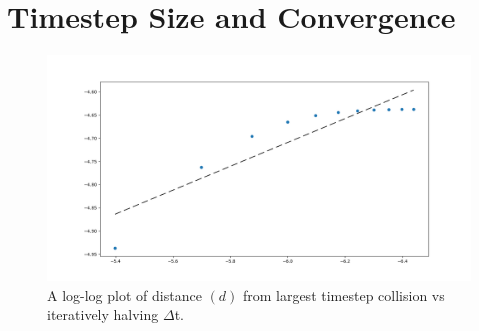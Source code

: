 \documentclass[twoside,11pt]{article}
\begin{document}

\section*{Timestep Size and Convergence}

\begin{figure}
  \includegraphics[width=\linewidth]{log-distance.png}
  \caption{A log-log plot of distance $(d)$ from largest timestep collision vs iteratively halving $\Delta$t.}
  \label{Fig 1:}
\end{figure}
\end{document}
